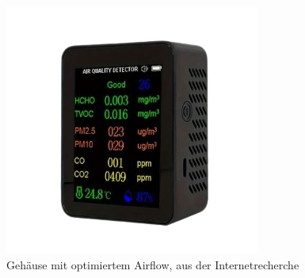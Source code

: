 \begin{inhalt}
\begin{figure}[!htb]
\centering
\includegraphics[width=0.75\textwidth]{files/Thomas/pics/new/Temu-removebg-preview.png}
\caption[Gehäuse mit optimiertem Airflow, aus der Internetrecherche \cite{TemuGehaeuse}]{Gehäuse mit optimiertem Airflow, aus der Internetrecherche \cite{TemuGehaeuse}}
\label{fig:gehaeuse_internet_bild}
\end{figure}



\end{inhalt}